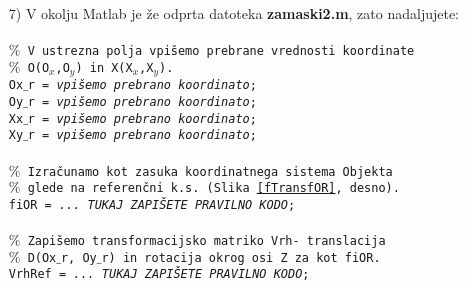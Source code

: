 \begin{enumerate}
\item[7)] V okolju Matlab je že odprta datoteka
\textbf{zamaski2.m}, zato nadaljujete: \\%
\\
\small
\textcolor[rgb]{0.50,0.50,0.50}{\texttt{$\%$ V ustrezna polja vpišemo prebrane vrednosti koordinate}} \\%
\textcolor[rgb]{0.50,0.50,0.50}{\texttt{$\%$ O(O$_x$,O$_y$) in X(X$_x$,X$_y$).}} \\%
\texttt{Ox$\_$r = \emph{vpišemo prebrano koordinato};}  \\%
\texttt{Oy$\_$r = \emph{vpišemo prebrano koordinato};}  \\%
\texttt{Xx$\_$r = \emph{vpišemo prebrano koordinato};}  \\%
\texttt{Xy$\_$r = \emph{vpišemo prebrano koordinato};}  \\%
\\
\textcolor[rgb]{0.50,0.50,0.50}{\texttt{$\%$ Izračunamo kot zasuka koordinatnega sistema Objekta}} \\%
\textcolor[rgb]{0.50,0.50,0.50}{\texttt{$\%$ glede na referenčni k.s. (Slika \ref{fTransfOR}, desno).}} \\%
\texttt{fiOR = \emph{... TUKAJ ZAPIŠETE PRAVILNO KODO};} \\ %
\\
\textcolor[rgb]{0.50,0.50,0.50}{\texttt{$\%$ Zapišemo transformacijsko matriko Vrh- translacija}} \\%
\textcolor[rgb]{0.50,0.50,0.50}{\texttt{$\%$ D(Ox$\_$r, Oy$\_$r) in rotacija okrog osi Z za kot fiOR.}} \\%
\texttt{VrhRef = \emph{... TUKAJ ZAPIŠETE PRAVILNO KODO};} \\ %


\end{enumerate}
